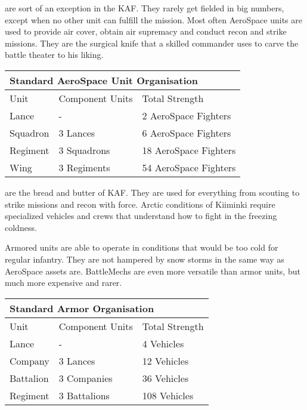 \documentclass{tufte-book}
\begin{document}
 are sort of an exception in the KAF. 
They rarely get fielded in big numbers, except when no other unit can
fulfill the mission. Most often AeroSpace units are used to provide air
cover, obtain air supremacy and conduct recon and strike missions. They
are the surgical knife that a skilled commander uses to carve the battle
theater to his liking.

\bigskip
\begin{minipage}{\textwidth}
\begin{center}
\begin{tabular}{lll}
\toprule
\multicolumn{3}{l}{Standard AeroSpace Unit Organisation} \\
\midrule
Unit & Component Units & Total Strength \\
\midrule
Lance    & -           & 2 AeroSpace Fighters \\
Squadron & 3 Lances    & 6 AeroSpace Fighters \\
Regiment & 3 Squadrons & 18 AeroSpace Fighters \\
Wing     & 3 Regiments & 54 AeroSpace Fighters \\
\bottomrule
\end{tabular}
\end{center}
\end{minipage}

 are the bread and butter of KAF. 
They are used for everything from scouting to strike missions and recon 
with force. Arctic conditions of Kiiminki require specialized vehicles 
and crews that understand how to fight in the freezing coldness.

Armored units are able to operate in conditions that would be too cold
for regular infantry. They are not hampered by snow storms in the same
way as AeroSpace assets are. BattleMechs are even more versatile than
armor units, but much more expensive and rarer.

\bigskip
\begin{minipage}{\textwidth}
\begin{center}
\begin{tabular}{lll}
\toprule
\multicolumn{3}{l}{Standard Armor Organisation} \\
\midrule
Unit & Component Units & Total Strength \\
\midrule
Lance     & -            & 4 Vehicles \\
Company   & 3 Lances     & 12 Vehicles \\
Battalion & 3 Companies  & 36 Vehicles \\
Regiment  & 3 Battalions & 108 Vehicles \\
\bottomrule
\end{tabular}
\end{center}
\end{minipage}
\end{document}
